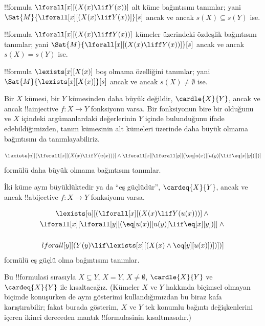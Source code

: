 \documentclass[../../../include/open-logic-section]{subfiles}
\begin{document}


\begin{prop}
!!{formula} $\lforall[x][(X(x) \lif Y(x))]$ alt küme bağıntısını tanımlar;
yani $\Sat{M}{\lforall[x][(X(x) \lif Y(x))]}[s]$ ancak ve ancak
$s(X)\subseteq s(Y)$ ise.
\end{prop}

\begin{prop}
!!{formula} $\lforall[x][(X(x) \liff Y(x))]$ kümeler üzerindeki özdeşlik
bağıntısını tanımlar; yani
$\Sat{M}{\lforall[x][(X(x) \liff Y(x))]}[s]$ ancak ve ancak $s(X)=s(Y)$ ise.
\end{prop}

\begin{prop}
!!{formula} $\lexists[x][X(x)]$ boş olmama özelliğini tanımlar; yani
$\Sat{M}{\lexists[x][X(x)]}[s]$ ancak ve ancak $s(X)\neq\emptyset$ ise.
\end{prop}

Bir $X$ kümesi, bir $Y$ kümesinden daha büyük değildir,
$\cardle{X}{Y}$, ancak ve ancak !!a{injective} $f\colon X\to Y$ fonksiyonu
varsa. Bir fonksiyonun bire bir olduğunu ve $X$ içindeki argümanlardaki
değerlerinin $Y$ içinde bulunduğunu ifade edebildiğimizden, tanım kümesinin
alt kümeleri üzerinde daha büyük olmama bağıntısını da tanımlayabiliriz.

\begin{prop}
\[
\lexists[u][(\lforall[x][(X(x) \lif Y(u(x)))] \land \lforall[x][\lforall[y][(\eq[u(x)][u(y)] \lif
      \eq[x][y])]])]
\]
formülü daha büyük olmama bağıntısını tanımlar.
\end{prop}

İki küme aynı büyüklüktedir ya da ``eş güçlüdür'', $\cardeq{X}{Y}$, ancak ve
ancak !!a{bijective} $f\colon X\to Y$ fonksiyonu varsa.

\begin{prop}
\begin{multline*}
  \lexists[u][(\lforall[x][(X(x) \lif Y(u(x)))] \land {}\\
    \lforall[x][\lforall[y][(\eq[u(x)][u(y)] \lif \eq[x][y])]]
  \land {} \\\\lforall[y][(Y(y) \lif \lexists[x][(X(x)
      \land \eq[y][u(x)])])])]
\end{multline*}
formülü eş güçlü olma bağıntısını tanımlar.
\end{prop}

Bu !!{formula}s{}i sırasıyla $X\subseteq Y$, $X=Y$, $X\neq\emptyset$,
$\cardle{X}{Y}$ ve $\cardeq{X}{Y}$ ile kısaltacağız. (Kümeler $X$ ve $Y$
hakkında biçimsel olmayan biçimde konuşurken de aynı gösterimi kullandığımızdan
bu biraz kafa karıştırabilir; fakat burada gösterim, $X$ ve $Y$ tek konumlu
bağıntı değişkenlerini içeren ikinci dereceden mantık !!{formula}s{}inin
kısaltmasıdır.)
\end{document}
